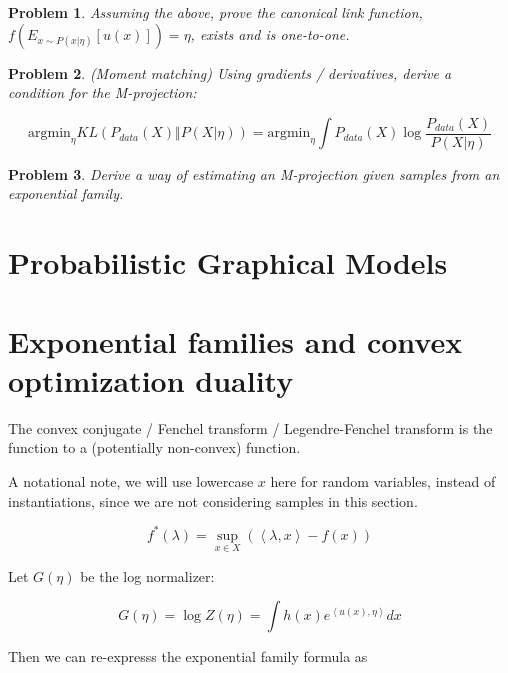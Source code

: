 \documentclass[a4paper]{article}
\newtheorem{problem}{Problem}[section]
\begin{document}
\begin{problem}
Assuming the above, prove the canonical link function, $f( E_{ x \sim P( x \vert \eta) } [ u(x) ] ) = \eta $, exists and is one-to-one.
\end{problem}

\begin{problem}
(Moment matching) Using gradients / derivatives, derive a condition for the M-projection:

\begin{equation}
  \text{argmin}_\eta KL \left( P_{data}(X) \Vert P( X \vert \eta) \right) = \text{argmin}_\eta \int P_{data}(X) \log \frac{ P_{data}(X) }{ P( X \vert \eta) }
  \label{}
\end{equation}
\end{problem}

\begin{problem}
Derive a way of estimating an M-projection given samples from an exponential family.
\end{problem}

\section{Probabilistic Graphical Models}

\section{Exponential families and convex optimization duality}

The convex conjugate / Fenchel transform / Legendre-Fenchel transform is the function to a (potentially non-convex) function.

A notational note, we will use lowercase $x$ here for random variables, instead of instantiations, since we are not considering samples in this section.

\begin{equation}
  f^*( \lambda ) = \sup_{x \in X} \left( \left< \lambda, x \right> - f(x) \right)
  \label{convex conjugate}
\end{equation}

Let $G(\eta)$ be the log normalizer:

\begin{equation}
  G(\eta) = \log Z(\eta) = \int h(x) e^{ \left< u(x), \eta \right> } dx
  \label{}
\end{equation}

Then we can re-expresss the exponential family formula as
\end{document}
